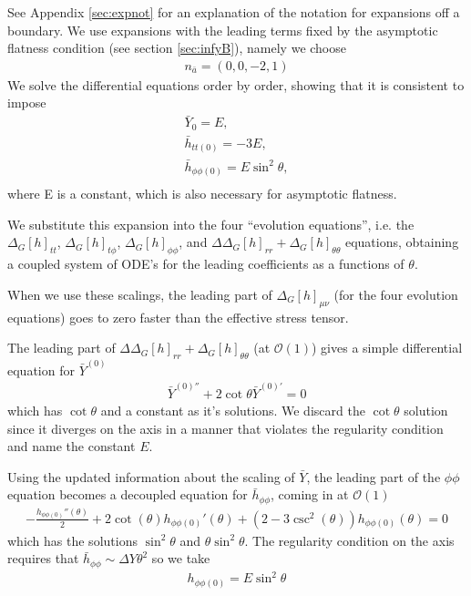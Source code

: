 \documentclass[aps,prd,amsmath,showpacs,amssymb,superscriptaddress,nofootinbib,longbibliography,eqsecnum,preprintnumbers]{revtex4-1}
\begin{document}
See Appendix \ref{sec:expnot} for an explanation of the notation for expansions off a boundary. We use expansions with the leading terms fixed by the asymptotic flatness condition (see section \ref{sec:infyB}), namely we choose
\begin{align}
n_{\bar a}=(0,0,-2,1)
\end{align}
We solve the differential equations order by order, showing that it is consistent to impose
\begin{align}
&\bar Y_{0}=E,&  \nonumber \\	
&\bar h_{tt(0)}=-3E,& \nonumber \\
&\bar h_{\phi\phi(0)}=E\sin^2\theta,& \nonumber \\
\end{align}
where E is a constant, which is also necessary for asymptotic flatness.

We substitute this expansion into the four ``evolution equations'', i.e. the $\Delta_G[h]_{tt}$,  $\Delta_G[h]_{t\phi}$,  $\Delta_G[h]_{\phi\phi}$, and $\Delta  \Delta_G[h]_{rr}+ \Delta_G[h]_{\theta\theta}$ equations, obtaining a coupled system of ODE's for the leading coefficients as a functions of $\theta$.

When we use these scalings, the leading part of $\Delta_G[h]_{\mu \nu}$ (for the four evolution equations) goes to zero faster than the effective stress tensor.

The leading part of  $\Delta  \Delta_G[h]_{rr}+ \Delta_G[h]_{\theta\theta}$ (at $\mathcal{O}(1)$) gives a simple differential equation for $\bar Y^{(0)}$
\begin{align}
\bar Y^{(0)''}+2\cot\theta \bar Y^{(0)'}=0
\end{align}
which has $\cot\theta$ and a constant as it's solutions. We discard the $\cot\theta$ solution since it diverges on the axis in a manner that violates the regularity condition and name the constant $E$.

Using the updated information about the scaling of $\bar Y$,  the leading part of the $\phi\phi$ equation becomes a decoupled equation for $\bar h_{\phi\phi}$, coming in at $\mathcal{O}(1)$
\begin{align}
-\frac{h_{\phi\phi(0)}''(\theta )}{2}+2 \cot (\theta ) h_{\phi\phi(0)}'(\theta )+\left(2-3 \csc ^2(\theta )\right) h_{\phi\phi(0)}(\theta )=0
\end{align}
which has the solutions  $\sin^2\theta$ and $\theta \sin^2\theta$. The regularity condition on the axis requires that $\bar h_{\phi\phi}\sim \Delta Y \theta^2$ so we take 
\begin{align}
h_{\phi\phi(0)}=E\sin^2\theta
\end{align}
\end{document}

